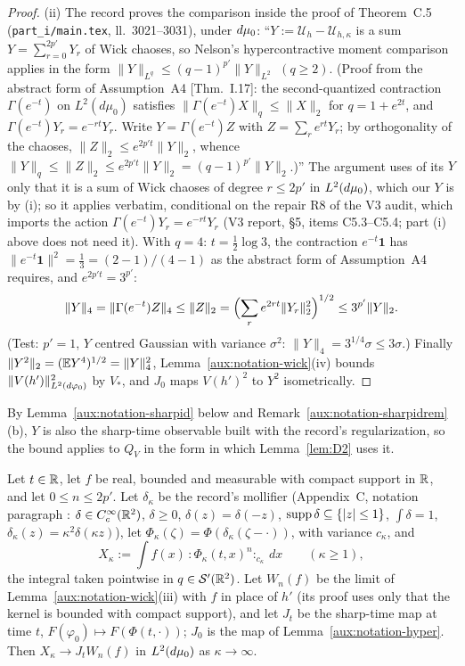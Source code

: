 \begin{proof}
(ii) The record proves the comparison inside the proof of Theorem~C.5 \cite[p.~41]{R}
(\texttt{part\_i/main.tex}, ll.~3021--3031), under $d\mu_0$: ``$Y:=\mathcal U_h-\mathcal
U_{h,\kappa}$ is a sum $Y=\sum_{r=0}^{2p'}Y_r$ of Wick chaoses, so Nelson's hypercontractive
moment comparison applies in the form $\|Y\|_{L^q}\le(q-1)^{p'}\|Y\|_{L^2}$ $(q\ge2)$.  (Proof
from the abstract form of Assumption~A4 [Thm.~I.17]: the second-quantized contraction
$\Gamma(e^{-t})$ on $L^2(d\mu_0)$ satisfies $\|\Gamma(e^{-t})X\|_q\le\|X\|_2$ for $q=1+e^{2t}$,
and $\Gamma(e^{-t})Y_r=e^{-rt}Y_r$.  Write $Y=\Gamma(e^{-t})Z$ with $Z=\sum_re^{rt}Y_r$; by
orthogonality of the chaoses, $\|Z\|_2\le e^{2p't}\|Y\|_2$, whence $\|Y\|_q\le\|Z\|_2\le
e^{2p't}\|Y\|_2=(q-1)^{p'}\|Y\|_2$.)''  The argument uses of its $Y$ only that it is a sum of
Wick chaoses of degree $r\le2p'$ in $L^2(d\mu_0)$, which our $Y$ is by (i); so it applies verbatim,
conditional on the repair R8 of the V3 audit, which imports the action
$\Gamma(e^{-t})Y_r=e^{-rt}Y_r$ (V3 report, \S5, items C5.3--C5.4; part (i) above does not need
it).  With $q=4$: $t=\frac12\log3$, the
contraction $e^{-t}\mathbf 1$ has $\|e^{-t}\mathbf 1\|^2=\frac13=(2-1)/(4-1)$ as the abstract
form of Assumption~A4 \cite[p.~9]{R} requires, and $e^{2p't}=3^{p'}$:
\[
 \|Y\|_4=\|\Gamma(e^{-t})Z\|_4\le\|Z\|_2=\Bigl(\sum_re^{2rt}\|Y_r\|_2^2\Bigr)^{1/2}\le
 3^{p'}\|Y\|_2 .
\]
(Test: $p'=1$, $Y$ centred Gaussian with variance $\sigma^2$: $\|Y\|_4=3^{1/4}\sigma\le3\sigma$.)
Finally $\|Y^2\|_2=(\mathbb{E} Y^4)^{1/2}=\|Y\|_4^2$, Lemma~\ref{aux:notation-wick}(iv) bounds
$\|V(h')\|_{L^2(d\varphi_0)}^2$ by $V_*$, and $J_0$ maps $V(h')^2$ to $Y^2$ isometrically.
\end{proof}

By Lemma~\ref{aux:notation-sharpid} below and Remark~\ref{aux:notation-sharpidrem}(b), $Y$ is also
the sharp-time observable built with the record's regularization, so the bound applies to $Q_V$ in
the form in which Lemma~\ref{lem:D2} uses it.

\begin{auxlemma}\label{aux:notation-sharpid}
Let $t\in\mathbb{R}$, let $f$ be real, bounded and measurable with compact support in $\mathbb{R}$, and let
$0\le n\le2p'$.  Let $\delta_\kappa$ be the record's mollifier (Appendix~C, notation paragraph
\cite[pp.~39--40]{R}: $\delta\in C_c^\infty(\mathbb{R}^2)$, $\delta\ge0$, $\delta(z)=\delta(-z)$,
$\operatorname{supp}\delta\subseteq\{|z|\le1\}$, $\int\delta=1$, $\delta_\kappa(z)=\kappa^2\delta(\kappa z)$),
let $\Phi_\kappa(\zeta)=\Phi(\delta_\kappa(\zeta-\cdot))$, with variance $c_\kappa$, and
\[
 X_\kappa:=\int f(x)\,{:}\Phi_\kappa(t,x)^n{:}_{c_\kappa}\,dx\qquad(\kappa\ge1),
\]
the integral taken pointwise in $q\in\mathcal S'(\mathbb{R}^2)$.  Let $W_n(f)$ be the limit of
Lemma~\ref{aux:notation-wick}(iii) with $f$ in place of $h'$ (its proof uses only that the kernel
is bounded with compact support), and let $J_t$ be the sharp-time map at time $t$,
$F(\varphi_0)\mapsto F(\Phi(t,\cdot))$; $J_0$ is the map of Lemma~\ref{aux:notation-hyper}.
Then $X_\kappa\to J_tW_n(f)$ in $L^2(d\mu_0)$ as $\kappa\to\infty$.
\end{auxlemma}

